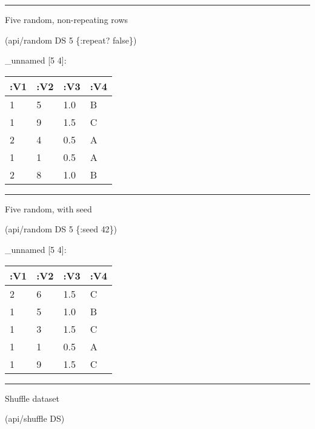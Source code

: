 \documentclass[]{article}
\newenvironment{Shaded}{\begin{snugshade}}{\end{snugshade}}
\newcommand{\AttributeTok}[1]{\textcolor[rgb]{0.77,0.63,0.00}{#1}}
\newcommand{\DecValTok}[1]{\textcolor[rgb]{0.00,0.00,0.81}{#1}}
\newcommand{\NormalTok}[1]{#1}
\newcommand{\VariableTok}[1]{\textcolor[rgb]{0.00,0.00,0.00}{#1}}
\begin{document}
\begin{center}\rule{0.5\linewidth}{0.5pt}\end{center}

Five random, non-repeating rows

\begin{Shaded}
\begin{Highlighting}[]
\NormalTok{(api/random DS }\DecValTok{5}\NormalTok{ \{}\AttributeTok{:repeat}\NormalTok{? }\VariableTok{false}\NormalTok{\})}
\end{Highlighting}
\end{Shaded}

\_unnamed {[}5 4{]}:

\begin{longtable}[]{@{}llll@{}}
\toprule
:V1 & :V2 & :V3 & :V4\tabularnewline
\midrule
\endhead
1 & 5 & 1.0 & B\tabularnewline
1 & 9 & 1.5 & C\tabularnewline
2 & 4 & 0.5 & A\tabularnewline
1 & 1 & 0.5 & A\tabularnewline
2 & 8 & 1.0 & B\tabularnewline
\bottomrule
\end{longtable}

\begin{center}\rule{0.5\linewidth}{0.5pt}\end{center}

Five random, with seed

\begin{Shaded}
\begin{Highlighting}[]
\NormalTok{(api/random DS }\DecValTok{5}\NormalTok{ \{}\AttributeTok{:seed} \DecValTok{42}\NormalTok{\})}
\end{Highlighting}
\end{Shaded}

\_unnamed {[}5 4{]}:

\begin{longtable}[]{@{}llll@{}}
\toprule
:V1 & :V2 & :V3 & :V4\tabularnewline
\midrule
\endhead
2 & 6 & 1.5 & C\tabularnewline
1 & 5 & 1.0 & B\tabularnewline
1 & 3 & 1.5 & C\tabularnewline
1 & 1 & 0.5 & A\tabularnewline
1 & 9 & 1.5 & C\tabularnewline
\bottomrule
\end{longtable}

\begin{center}\rule{0.5\linewidth}{0.5pt}\end{center}

Shuffle dataset

\begin{Shaded}
\begin{Highlighting}[]
\NormalTok{(api/shuffle DS)}
\end{Highlighting}
\end{Shaded}
\end{document}
